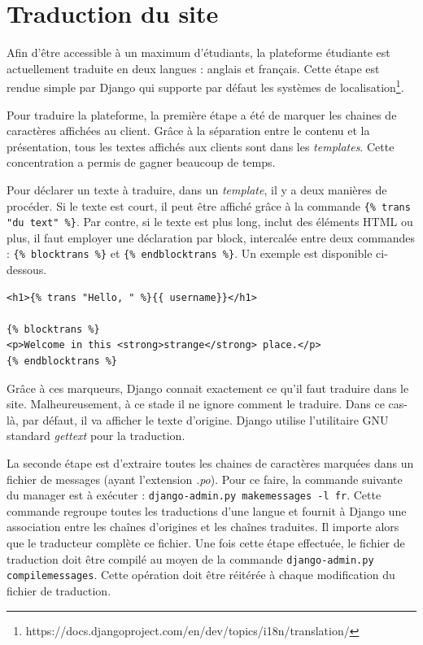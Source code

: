 \documentclass[a4paper,12pt]{article}
\begin{document}
\section{Traduction du site}

Afin d'être accessible à un maximum d'étudiants, la plateforme étudiante est actuellement traduite
en deux langues : anglais et français.
Cette étape est rendue simple par Django qui supporte par défaut les systèmes
de localisation\footnote{https://docs.djangoproject.com/en/dev/topics/i18n/translation/}.

Pour traduire la plateforme, la première étape a été de marquer les chaines de
caractères affichées au client. Grâce à la séparation entre le contenu et la présentation,
tous les textes affichés aux clients sont dans les \textit{templates}. Cette concentration
a permis de gagner beaucoup de temps.

Pour déclarer un texte à traduire, dans un \textit{template}, il y a deux manières
de procéder. Si le texte est court, il peut être affiché grâce à la commande 
\texttt{\{\% trans "du text" \%\}}. Par contre, si le texte est plus long, inclut des
éléments HTML ou plus, il faut employer une déclaration par block, intercalée entre
deux commandes : \texttt{\{\% blocktrans \%\}} et \texttt{\{\% endblocktrans \%\}}.
Un exemple est disponible ci-dessous.

\begin{verbatim}
<h1>{% trans "Hello, " %}{{ username}}</h1>

{% blocktrans %}
<p>Welcome in this <strong>strange</strong> place.</p>
{% endblocktrans %}
\end{verbatim}

Grâce à ces marqueurs, Django connait exactement ce qu'il faut traduire dans le site.
Malheureusement, à ce stade il ne ignore comment le traduire. Dans ce cas-là,
par défaut, il va afficher le texte d'origine. Django utilise l'utilitaire GNU
standard \textit{gettext} pour la traduction.

La seconde étape est d'extraire toutes les chaines de caractères
marquées dans un fichier de messages (ayant l'extension \textit{.po}).
Pour ce faire, la commande suivante du
manager est à exécuter : \texttt{django-admin.py makemessages -l fr}. Cette commande
regroupe toutes les traductions d'une langue et fournit à Django une association
entre les chaînes d'origines et les chaînes traduites. Il importe alors que le traducteur
complète ce fichier. Une fois cette étape effectuée, le fichier de traduction 
doit être compilé au moyen de la commande \texttt{django-admin.py compilemessages}.
Cette opération doit être réitérée à chaque modification du fichier de traduction.
\end{document}
